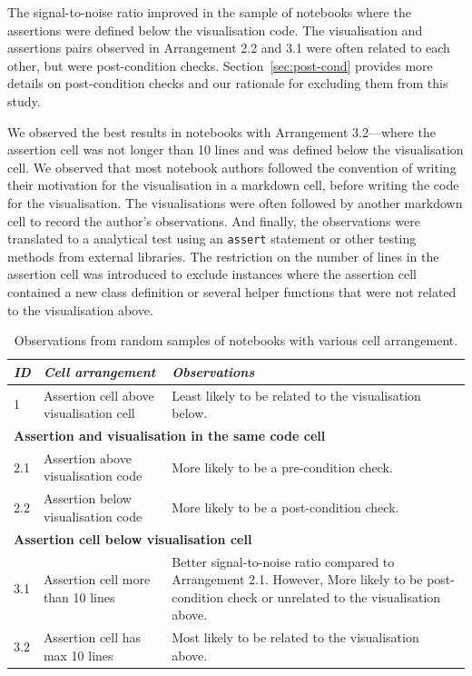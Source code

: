 \documentclass[conference]{IEEEtran}
\begin{document}
The signal-to-noise ratio improved in the sample of notebooks where the assertions were defined below the visualisation code. The visualisation and assertions pairs observed in Arrangement 2.2 and 3.1 were often related to each other, but were post-condition checks. Section~\ref{sec:post-cond} provides more details on post-condition checks and our rationale for excluding them from this study.

We observed the best results in notebooks with Arrangement 3.2---where the assertion cell was not longer than 10 lines and was defined below the visualisation cell. We observed that most notebook authors followed the convention of writing their motivation for the visualisation in a markdown cell, before writing the code for the visualisation. The visualisations were often followed by another markdown cell to record the author's observations. And finally, the observations were translated to a analytical test using an \texttt{assert} statement or other testing methods from external libraries. The restriction on the number of lines in the assertion cell was introduced to exclude instances where the assertion cell contained a new class definition or several helper functions that were not related to the visualisation above.

\begin{table}
  \centering
  \caption{Observations from random samples of notebooks with various
  cell arrangement.}
  \begin{tabular}{l p{} p{}}
    \hline
    \emph{\textbf{ID}}&
    \emph{\textbf{Cell arrangement}} &
    \emph{\textbf{Observations}}\\
    \hline
    1 &
    Assertion cell above visualisation cell &
    Least likely to be related to the visualisation below.\\
    \hline
    \multicolumn{3}{l}{\textbf{Assertion and visualisation in the same code cell}}\\
    \hline
    2.1 &
    Assertion above visualisation code &
    More likely to be a pre-condition check.\\
    2.2 &
    Assertion below visualisation code &
    More likely to be a post-condition check.\\
    \hline
    \multicolumn{3}{l}{\textbf{Assertion cell below visualisation cell}}\\
    \hline
    3.1 &
    Assertion cell more than 10 lines &
    Better signal-to-noise ratio compared to Arrangement 2.1. However, More likely to be post-condition check or unrelated to the visualisation above.\\
    3.2 &
    Assertion cell has max 10 lines &
    Most likely to be related to the visualisation above.\\
    \hline
  \end{tabular}
  \label{tab:cell-arrangement}
\end{table}
\end{document}
